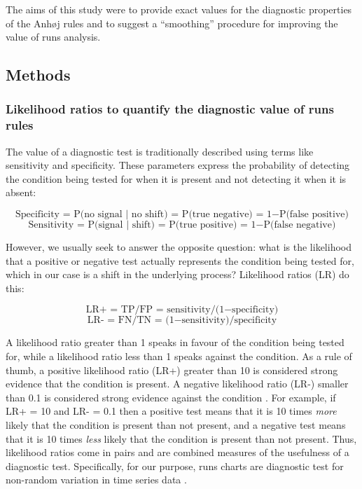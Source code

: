 The aims of this study were to provide exact values for the diagnostic
properties of the Anhøj rules and to suggest a ``smoothing'' procedure
for improving the value of runs analysis.

\hypertarget{methods}{%
\subsection{Methods}\label{methods}}

\hypertarget{likelihood-ratios-to-quantify-the-diagnostic-value-of-runs-rules}{%
\subsubsection{Likelihood ratios to quantify the diagnostic value of
runs
rules}\label{likelihood-ratios-to-quantify-the-diagnostic-value-of-runs-rules}}

The value of a diagnostic test is traditionally described using terms
like sensitivity and specificity. These parameters express the
probability of detecting the condition being tested for when it is
present and not detecting it when it is absent:

\[ \text{Specificity = P(no signal | no shift) = P(true negative) = 1} - \text{P(false positive)} \]
\[ \text{Sensitivity = P(signal | shift) = P(true positive) = 1} - \text{P(false negative)} \]

However, we usually seek to answer the opposite question: what is the
likelihood that a positive or negative test actually represents the
condition being tested for, which in our case is a shift in the
underlying process? Likelihood ratios (LR) do this:

\[ \text{LR+ = TP/FP = sensitivity/(1} - \text{specificity)} \]
\[ \text{LR- = FN/TN = (1} - \text{sensitivity)/specificity} \]

A likelihood ratio greater than 1 speaks in favour of the condition
being tested for, while a likelihood ratio less than 1 speaks against
the condition. As a rule of thumb, a positive likelihood ratio (LR+)
greater than 10 is considered strong evidence that the condition is
present. A negative likelihood ratio (LR-) smaller than 0.1 is
considered strong evidence against the condition \citep{deeks2004}. For
example, if LR+ = 10 and LR- = 0.1 then a positive test means that it is
10 times \emph{more} likely that the condition is present than not
present, and a negative test means that it is 10 times \emph{less}
likely that the condition is present than not present. Thus, likelihood
ratios come in pairs and are combined measures of the usefulness of a
diagnostic test. Specifically, for our purpose, runs charts are
diagnostic test for non-random variation in time series data
\citep{anhoej2015, anhoej2018}.


